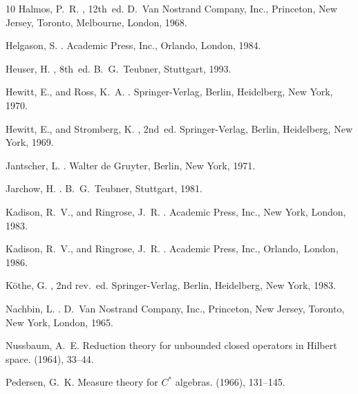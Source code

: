 \documentclass[11pt,twoside,openright]{report}
\theoremstyle{definition}
\theoremstyle{plain}
\theoremstyle{remark}
\theoremstyle{assumption}
\begin{document}
\begin{thebibliography}{10}
{\sc Halmos, P.~R.}
, 12th~ed.
\newblock D.~Van Nostrand Company, Inc., Princeton, New Jersey, Toronto,
  Melbourne, London, 1968.

{\sc Helgason, S.}
.
\newblock Academic Press, Inc., Orlando, London, 1984.

{\sc Heuser, H.}
, 8th~ed.
\newblock B.~G.~Teubner, Stuttgart, 1993.

{\sc Hewitt, E., and Ross, K.~A.}
.
\newblock Springer-Verlag, Berlin, Heidelberg, New York, 1970.

{\sc Hewitt, E., and Stromberg, K.}
, 2nd~ed.
\newblock Springer-Verlag, Berlin, Heidelberg, New York, 1969.

{\sc Jantscher, L.}
.
\newblock Walter de Gruyter, Berlin, New York, 1971.

{\sc Jarchow, H.}
.
\newblock B.~G.~Teubner, Stuttgart, 1981.

{\sc Kadison, R.~V., and Ringrose, J.~R.}
.
\newblock Academic Press, Inc., New York, London, 1983.

{\sc Kadison, R.~V., and Ringrose, J.~R.}
.
\newblock Academic Press, Inc., Orlando, London, 1986.

{\sc K\"othe, G.}
, 2nd rev.~ed.
\newblock Springer-Verlag, Berlin, Heidelberg, New York, 1983.

{\sc Nachbin, L.}
.
\newblock D.~Van Nostrand Company, Inc., Princeton, New Jersey, Toronto, New
  York, London, 1965.

{\sc Nussbaum, A.~E.}
\newblock Reduction theory for unbounded closed operators in {Hilbert} space.
 (1964), 33--44.

{\sc Pedersen, G.~K.}
\newblock Measure theory for {$C^*$} algebras.
 (1966), 131--145.


\end{thebibliography}
\end{document}
